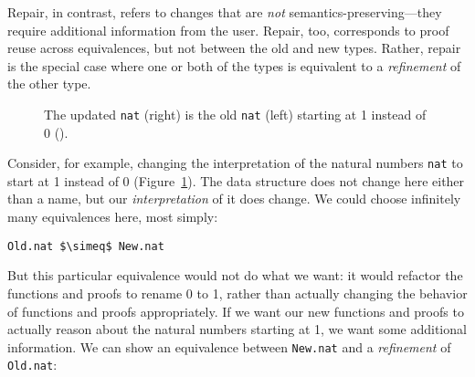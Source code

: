 Repair, in contrast, refers to changes that are \textit{not} semantics-preserving---they require additional information
from the user.
Repair, too, corresponds to proof reuse across equivalences, but not between the old and new types.
Rather, repair is the special case where one or both of the types is equivalent to a \textit{refinement}
of the other type.

\begin{figure}
\begin{minipage}{0.46\textwidth}
   
\end{minipage}
\hfill
\begin{minipage}{0.46\textwidth}
   
\end{minipage}
\caption{The updated \lstinline{nat} (right) is the old \lstinline{nat} (left) starting at 1 instead of 0 ().}
\label{fig:natrepair}
\end{figure}

Consider, for example, changing the interpretation of the natural numbers \lstinline{nat} to start at 1 instead of 0 (Figure~\ref{fig:natrepair}).
The data structure does not change here either than a name, but our \textit{interpretation} of it does change.
We could choose infinitely many equivalences here, most simply:

\begin{lstlisting}
Old.nat $\simeq$ New.nat
\end{lstlisting}
But this particular equivalence would not do what we want: it would refactor the functions and proofs to rename 0 to 1, rather than
actually changing the behavior of functions and proofs appropriately.
If we want our new functions and proofs to actually reason about the natural numbers starting at 1, we want some additional information.
We can show an equivalence between \lstinline{New.nat} and a \textit{refinement} of \lstinline{Old.nat}:

